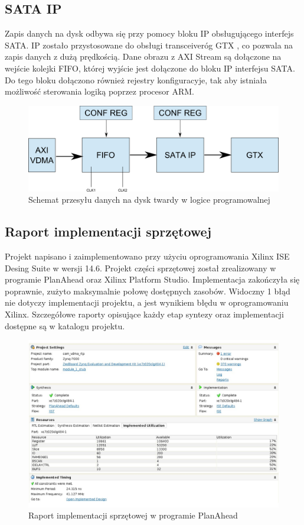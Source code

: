 \documentclass[a4paper,11pt,oneside]{report}  %
\begin{document}
\subsection{SATA IP}
Zapis danych na dysk odbywa się przy pomocy bloku IP obsługującego interfejs SATA. IP zostało przystosowane do obsługi transceiveróg GTX \cite{GTX}, co pozwala na zapis danych z dużą prędkością. Dane obrazu z AXI Stream są dołączone na wejście kolejki FIFO, której wyjście jest dołączone do bloku IP interfejsu SATA. Do tego bloku dołączono również rejestry konfiguracyje, tak aby istniała możliwość sterowania logiką poprzez procesor ARM. 

\begin{figure}[H]
	\centering
	\includegraphics[width=12cm]{data10.png}
	\caption{Schemat przesyłu danych na dysk twardy w logice programowalnej}
	\label{fig:Zynq10}
\end{figure}


\subsection{Raport implementacji sprzętowej}
Projekt napisano i zaimplementowano przy użyciu oprogramowania Xilinx ISE Desing Suite w wersji 14.6. Projekt części sprzętowej został zrealizowany w programie PlanAhead oraz Xilinx Platform Studio. Implementacja zakończyła się poprawnie, zużyto maksymalnie połowę dostępnych zasobów. Widoczny 1 błąd nie dotyczy implementacji projektu, a jest wynikiem błędu w oprogramowaniu Xilinx. Szczegółowe raporty opisujące każdy etap syntezy oraz implementacji dostępne są w katalogu projektu.

\begin{figure}[H]
	\centering
	\includegraphics[width=16cm]{data7.png}
	\caption{Raport implementacji sprzętowej w programie PlanAhead}
	\label{fig:Zynq7}
\end{figure}
\end{document}
